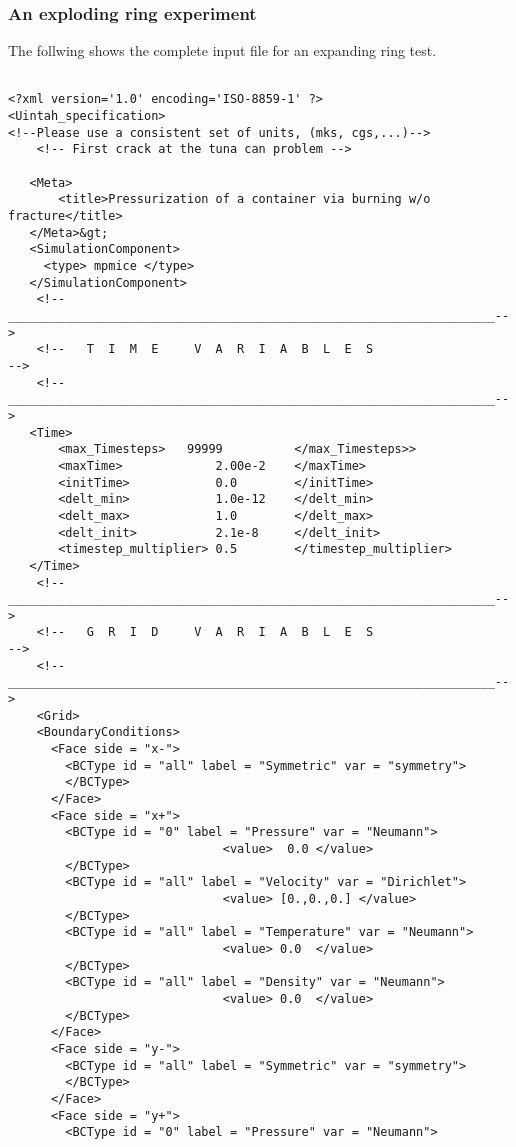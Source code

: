   \subsubsection{An exploding ring experiment}
  The follwing shows the complete input file for an expanding ring test.
  \begin{verbatim}

<?xml version='1.0' encoding='ISO-8859-1' ?>
<Uintah_specification> 
<!--Please use a consistent set of units, (mks, cgs,...)-->
    <!-- First crack at the tuna can problem -->

   <Meta>
       <title>Pressurization of a container via burning w/o fracture</title>
   </Meta>&gt;    
   <SimulationComponent>
     <type> mpmice </type>
   </SimulationComponent>
    <!--____________________________________________________________________-->
    <!--   T  I  M  E     V  A  R  I  A  B  L  E  S                         -->
    <!--____________________________________________________________________-->
   <Time>
       <max_Timesteps>   99999          </max_Timesteps>>
       <maxTime>             2.00e-2    </maxTime>
       <initTime>            0.0        </initTime>
       <delt_min>            1.0e-12    </delt_min>
       <delt_max>            1.0        </delt_max>
       <delt_init>           2.1e-8     </delt_init>
       <timestep_multiplier> 0.5        </timestep_multiplier>
   </Time>    
    <!--____________________________________________________________________-->
    <!--   G  R  I  D     V  A  R  I  A  B  L  E  S                         -->
    <!--____________________________________________________________________-->
    <Grid>
    <BoundaryConditions>
      <Face side = "x-">
        <BCType id = "all" label = "Symmetric" var = "symmetry">
        </BCType>
      </Face>
      <Face side = "x+">
        <BCType id = "0" label = "Pressure" var = "Neumann">
                              <value>  0.0 </value>
        </BCType>
        <BCType id = "all" label = "Velocity" var = "Dirichlet">
                              <value> [0.,0.,0.] </value>
        </BCType>
        <BCType id = "all" label = "Temperature" var = "Neumann">
                              <value> 0.0  </value>
        </BCType>
        <BCType id = "all" label = "Density" var = "Neumann">
                              <value> 0.0  </value>
        </BCType>
      </Face>
      <Face side = "y-">
        <BCType id = "all" label = "Symmetric" var = "symmetry">
        </BCType>
      </Face>                  
      <Face side = "y+">
        <BCType id = "0" label = "Pressure" var = "Neumann">

\end{verbatim}
